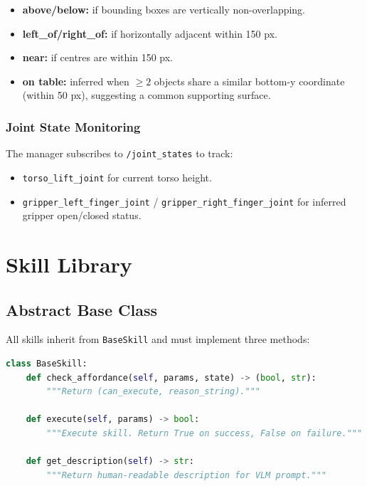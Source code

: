 \documentclass[12pt,a4paper]{report}
\begin{document}
\begin{itemize}[noitemsep]
  \item \textbf{above/below:} if bounding boxes are vertically non-overlapping.
  \item \textbf{left\_of/right\_of:} if horizontally adjacent within 150 px.
  \item \textbf{near:} if centres are within 150 px.
  \item \textbf{on table:} inferred when $\geq 2$ objects share a similar bottom-y coordinate
        (within 50 px), suggesting a common supporting surface.
\end{itemize}

\subsection{Joint State Monitoring}

The manager subscribes to \texttt{/joint\_states} to track:
\begin{itemize}[noitemsep]
  \item \texttt{torso\_lift\_joint} for current torso height.
  \item \texttt{gripper\_left\_finger\_joint} / \texttt{gripper\_right\_finger\_joint}
        for inferred gripper open/closed status.
\end{itemize}

\chapter{Skill Library}

\section{Abstract Base Class}

All skills inherit from \texttt{BaseSkill} and must implement three methods:

\begin{lstlisting}[language=Python, caption={\texttt{skills/base\_skill.py} interface.}]
class BaseSkill:
    def check_affordance(self, params, state) -> (bool, str):
        """Return (can_execute, reason_string)."""

    def execute(self, params) -> bool:
        """Execute skill. Return True on success, False on failure."""

    def get_description(self) -> str:
        """Return human-readable description for VLM prompt."""
\end{lstlisting}
\end{document}
